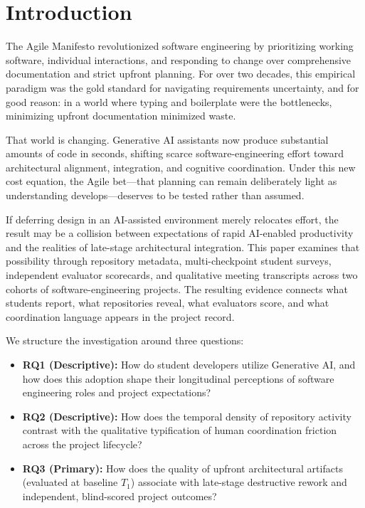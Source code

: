 \section{Introduction}
The Agile Manifesto revolutionized software engineering by prioritizing
working software, individual interactions, and responding to change over
comprehensive documentation and strict upfront planning. For over two decades,
this empirical paradigm was the gold standard for navigating requirements
uncertainty, and for good reason: in a world where typing and boilerplate were
the bottlenecks, minimizing upfront documentation minimized waste.

That world is changing. Generative AI assistants now produce substantial
amounts of code in seconds, shifting scarce software-engineering effort toward
architectural alignment, integration, and cognitive coordination. Under this
new cost equation, the Agile bet---that planning can remain deliberately light
as understanding develops---deserves to be tested rather than assumed.

If deferring design in an AI-assisted environment merely relocates effort, the
result may be a collision between expectations of rapid AI-enabled productivity
and the realities of late-stage architectural integration. This paper examines
that possibility through repository metadata, multi-checkpoint student surveys,
independent evaluator scorecards, and qualitative meeting transcripts across two
cohorts of software-engineering projects. The resulting evidence connects what
students report, what repositories reveal, what evaluators score, and what
coordination language appears in the project record.

We structure the investigation around three questions:

\begin{itemize}
	\item \textbf{RQ1 (Descriptive):} How do student developers utilize Generative AI, and how does this adoption shape their longitudinal perceptions of software engineering roles and project expectations?
	\item \textbf{RQ2 (Descriptive):} How does the temporal density of repository activity contrast with the qualitative typification of human coordination friction across the project lifecycle?
	\item \textbf{RQ3 (Primary):} How does the quality of upfront architectural artifacts (evaluated at baseline $T_1$) associate with late-stage destructive rework and independent, blind-scored project outcomes?
\end{itemize}

